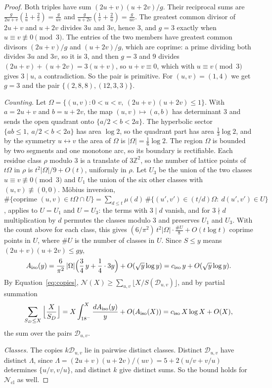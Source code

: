 \documentclass[10pt]{article}
\newcommand{\Z}{\mathbb{Z}}
\newcommand{\N}{\mathcal{N}}
\newcommand{\Ncl}{\mathcal{N}_{\mathrm{cl}}}
\newcommand{\ciso}{c_{\mathrm{iso}}}
\begin{document}
\begin{proof}
Both triples have sum $(2u+v)(u+2v)/g$. Their reciprocal sums are $\frac g{2u+v}(\frac1u+\frac2v)=\frac g{uv}$ and $\frac g{u+2v}(\frac1v+\frac2u)=\frac g{uv}$. The greatest common divisor of $2u+v$ and $u+2v$ divides $3u$ and $3v$, hence $3$, and $g=3$ exactly when $u\equiv v\not\equiv0\pmod 3$. The entries of the two members have greatest common divisors $(2u+v)/g$ and $(u+2v)/g$, which are coprime: a prime dividing both divides $3u$ and $3v$, so it is $3$, and then $g=3$ and $9$ divides $(2u+v)+(u+2v)=3(u+v)$, so $u+v\equiv0$, which with $u\equiv v\pmod3$ gives $3\mid u$, a contradiction. So the pair is primitive. For $(u,v)=(1,4)$ we get $g=3$ and the pair $\{(2,8,8),(12,3,3)\}$.

\emph{Counting.} Let $\Omega=\{(u,v):0<u<v,\ (2u+v)(u+2v)\le1\}$. With $a=2u+v$ and $b=u+2v$, the map $(u,v)\mapsto(a,b)$ has determinant $3$ and sends the open quadrant onto $\{a/2<b<2a\}$. The hyperbolic sector $\{ab\le1,\ a/2<b<2a\}$ has area $\log2$, so the quadrant part has area $\frac13\log2$, and by the symmetry $u\leftrightarrow v$ the area of $\Omega$ is $|\Omega|=\frac16\log2$. The region $\Omega$ is bounded by two segments and one monotone arc, so its boundary is rectifiable. Each residue class $\rho$ modulo $3$ is a translate of $3\Z^2$, so the number of lattice points of $t\Omega$ in $\rho$ is $t^2|\Omega|/9+O(t)$, uniformly in $\rho$. Let $U_3$ be the union of the two classes $u\equiv v\not\equiv0\pmod3$ and $U_1$ the union of the six other classes with $(u,v)\not\equiv(0,0)$. M\"obius inversion, $\#\{\text{coprime }(u,v)\in t\Omega\cap U\}=\sum_{d\le t}\mu(d)\,\#\{(u',v')\in(t/d)\Omega:\ d(u',v')\in U\}$, applies to $U=U_1$ and $U=U_3$: the terms with $3\mid d$ vanish, and for $3\nmid d$ multiplication by $d$ permutes the classes modulo $3$ and preserves $U_1$ and $U_3$. With the count above for each class, this gives $(6/\pi^2)\,t^2|\Omega|\cdot\frac{\#U}8+O(t\log t)$ coprime points in $U$, where $\#U$ is the number of classes in $U$. Since $S\le y$ means $(2u+v)(u+2v)\le gy$,
\[
  A_{\rm iso}(y)=\frac6{\pi^2}\,|\Omega|\Big(\frac34\,y+\frac14\cdot3y\Big)+O(\sqrt y\log y)=\ciso\,y+O(\sqrt y\log y).
\]
By Equation~\eqref{eq:copies}, $\N(X)\ge\sum_{u,v}\lfloor X/S(\mathcal D_{u,v})\rfloor$, and by partial summation
\[
  \sum_{S_D\le X}\Big\lfloor\frac X{S_D}\Big\rfloor=X\int_{18^-}^{X}\frac{dA_{\rm iso}(y)}{y}+O(A_{\rm iso}(X))=\ciso\,X\log X+O(X),
\]
the sum over the pairs $\mathcal D_{u,v}$.

\emph{Classes.} The copies $k\mathcal D_{u,v}$ lie in pairwise distinct classes. Distinct $\mathcal D_{u,v}$ have distinct $\Lambda$, since $\Lambda=(2u+v)(u+2v)/(uv)=5+2(u/v+v/u)$ determines $\{u/v,v/u\}$, and distinct $k$ give distinct sums. So the bound holds for $\Ncl$ as well.
\end{proof}
\end{document}
